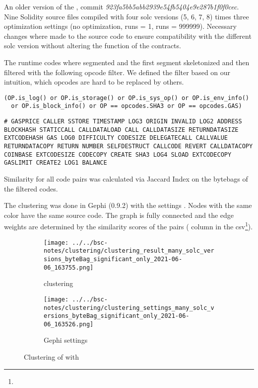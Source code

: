 \documentclass[../main.tex]{subfiles}
\begin{document}
An older version of the , commit \textit{923fa5bb5abb2939e54fb5404e9e287b1f0f0cec}.
Nine Solidity source files compiled with four solc versions (5, 6, 7, 8) times three optimization
settings (no optimization, runs = 1, runs = 999999).
Necessary changes where made to the source code to ensure compatibility with the different solc
version without altering the function of the contracts.

The runtime codes where segmented and the first segment skeletonized and then filtered with the following opcode filter. We defined the filter based on our intuition, which opcodes are hard to be replaced by others.
\begin{lstlisting}[style=pymd]
(OP.is_log() or OP.is_storage() or OP.is_sys_op() or OP.is_env_info()
  or OP.is_block_info() or OP == opcodes.SHA3 or OP == opcodes.GAS)
\end{lstlisting}
\begin{lstlisting}[style=pysm]
# GASPRICE CALLER SSTORE TIMESTAMP LOG3 ORIGIN INVALID LOG2 ADDRESS BLOCKHASH STATICCALL CALLDATALOAD CALL CALLDATASIZE RETURNDATASIZE EXTCODEHASH GAS LOG0 DIFFICULTY CODESIZE DELEGATECALL CALLVALUE RETURNDATACOPY RETURN NUMBER SELFDESTRUCT CALLCODE REVERT CALLDATACOPY COINBASE EXTCODESIZE CODECOPY CREATE SHA3 LOG4 SLOAD EXTCODECOPY GASLIMIT CREATE2 LOG1 BALANCE
\end{lstlisting}

Similarity for all code pairs was calculated via Jaccard Index on the bytebags of the filtered codes.

The clustering  was done in Gephi (0.9.2) with the settings .
Nodes with the same color have the same source code.
The graph is fully connected and the edge weights are determined by the similarity scores of the pairs ( column in the csv\footnote{}).

\begin{figure}[ht!]
  \begin{subfigure}[c]{.6\linewidth}
    \texttt{[image: ../../bsc-notes/clustering/clustering\_result\_many\_solc\_versions\_byteBag\_significant\_only\_2021-06-06\_163755.png]}
    \caption{clustering}
    \label{fig:solc_bytebag_cluster}
  \end{subfigure}%
  \begin{subfigure}[c]{.4\linewidth}
    \texttt{[image: ../../bsc-notes/clustering/clustering\_settings\_many\_solc\_versions\_byteBag\_significant\_only\_2021-06-06\_163526.png]}
    \caption{Gephi settings}
    \label{fig:solc_bytebag_cluster_settings}
  \end{subfigure}
  \caption{Clustering of \n{\solcts} with }
\end{figure}
\end{document}
